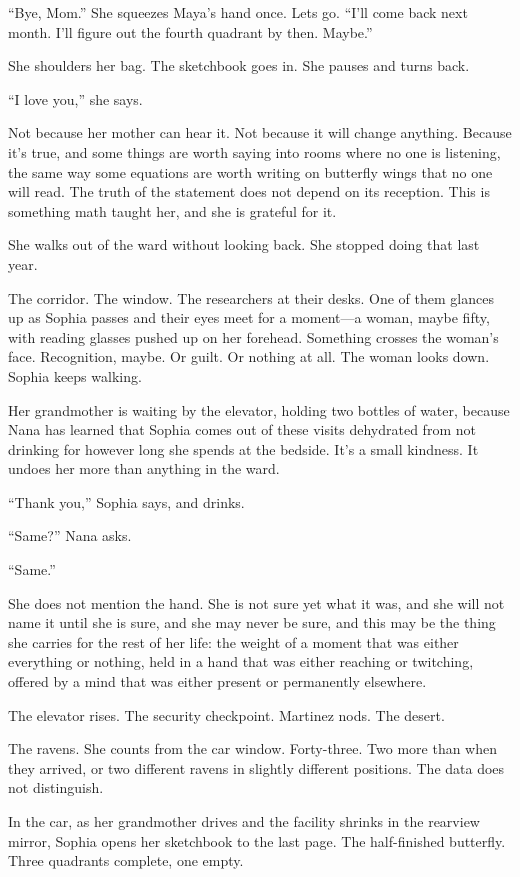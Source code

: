 ``Bye, Mom.'' She squeezes Maya's hand once. Lets go. ``I'll come back next month. I'll figure out the fourth quadrant by then. Maybe.''

She shoulders her bag. The sketchbook goes in. She pauses and turns back.

``I love you,'' she says.

Not because her mother can hear it. Not because it will change anything. Because it's true, and some things are worth saying into rooms where no one is listening, the same way some equations are worth writing on butterfly wings that no one will read. The truth of the statement does not depend on its reception. This is something math taught her, and she is grateful for it.

She walks out of the ward without looking back. She stopped doing that last year.

The corridor. The window. The researchers at their desks. One of them glances up as Sophia passes and their eyes meet for a moment---a woman, maybe fifty, with reading glasses pushed up on her forehead. Something crosses the woman's face. Recognition, maybe. Or guilt. Or nothing at all. The woman looks down. Sophia keeps walking.

Her grandmother is waiting by the elevator, holding two bottles of water, because Nana has learned that Sophia comes out of these visits dehydrated from not drinking for however long she spends at the bedside. It's a small kindness. It undoes her more than anything in the ward.

``Thank you,'' Sophia says, and drinks.

``Same?'' Nana asks.

``Same.''

She does not mention the hand. She is not sure yet what it was, and she will not name it until she is sure, and she may never be sure, and this may be the thing she carries for the rest of her life: the weight of a moment that was either everything or nothing, held in a hand that was either reaching or twitching, offered by a mind that was either present or permanently elsewhere.

The elevator rises. The security checkpoint. Martinez nods. The desert.

The ravens. She counts from the car window. Forty-three. Two more than when they arrived, or two different ravens in slightly different positions. The data does not distinguish.

In the car, as her grandmother drives and the facility shrinks in the rearview mirror, Sophia opens her sketchbook to the last page. The half-finished butterfly. Three quadrants complete, one empty.


